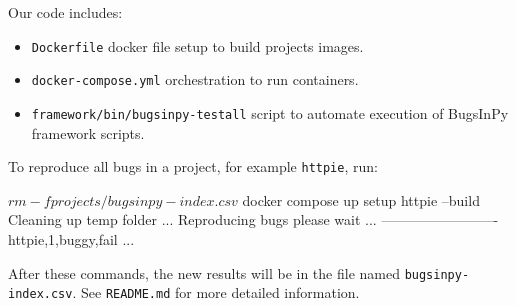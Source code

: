 \documentclass[conference]{IEEEtran}
\begin{document}
Our code includes:
\begin{itemize}
  \item \texttt{Dockerfile} docker file setup to build projects images.
  \item \texttt{docker-compose.yml} orchestration to run containers.
  \item \texttt{framework/bin/bugsinpy-testall} script to automate execution of BugsInPy framework scripts.
\end{itemize}

To reproduce all bugs in a project, for example \texttt{httpie}, run:

\begin{verbatim*}
$ rm -f projects/bugsinpy-index.csv
$ docker compose up setup httpie --build
Cleaning up temp folder ...
Reproducing bugs please wait ...
-------------------------
httpie,1,buggy,fail
...
\end{verbatim*}

After these commands, the new results will be in the file named \texttt{bugsinpy-index.csv}.
See \texttt{README.md} for more detailed information.
\end{document}
